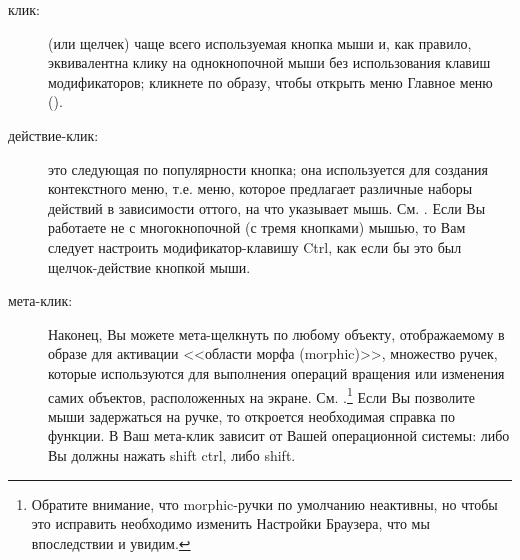 \documentclass[a4paper,10pt,twoside]{book}
\begin{document}
\begin{description}

\item[клик:] (или щелчек) чаще всего используемая кнопка мыши и,
как правило, эквивалентна клику на однокнопочной мыши без
использования клавиш модификаторов; кликнете по образу,
чтобы открыть меню Главное меню (). 
 

\item[действие-клик:] это следующая по популярности кнопка;
она используется для создания контекстного меню,
т.е. меню, которое предлагает различные наборы
действий в зависимости оттого, на что указывает мышь.
См. . Если Вы работаете не с
многокнопочной (с тремя кнопками) мышью, то Вам следует настроить
модификатор-клавишу Ctrl, как если бы
это был щелчок-действие кнопкой мыши. 
 

\item[мета-клик:] Наконец, Вы можете мета-щелкнуть по любому объекту,
отображаемому в образе для активации <<области морфа (morphic)>>,
множество ручек, которые используются для выполнения операций
вращения или изменения самих объектов, расположенных на экране.
См. .\footnote{Обратите внимание,
что morphic-ручки по умолчанию неактивны,
но чтобы это исправить необходимо изменить Настройки Браузера,
что мы впоследствии  и увидим.}
Если Вы позволите мыши задержаться на ручке,
то откроется необходимая справка по функции.
В \pharo Ваш мета-клик зависит от Вашей операционной системы: либо Вы
должны нажать shift ctrl, либо shift.


\end{description}
\end{document}
